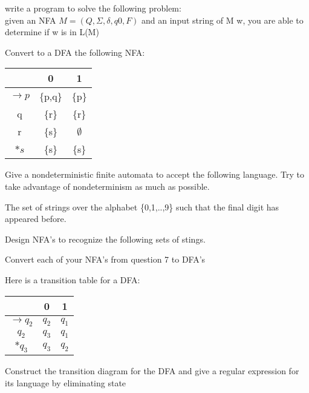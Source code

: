 \documentclass{exam}
\begin{document}
\begin{questions}
  \question
  write a program to solve the following problem:\\
  given an NFA $M = (Q, \Sigma, \delta, q0, F)$ and an input string of
  M w, you are able to determine if w is in L(M)

  \question
  Convert to a DFA the following NFA:
  \begin{center}
    \begin{tabular}{c|c|c}
      &0&1\\
      \hline
      $\rightarrow p$&\{p,q\}&\{p\}\\
      q&\{r\}&\{r\}\\
      r&\{s\}&$\emptyset$\\
      $*s$&\{s\}&\{s\}
    \end{tabular}
  \end{center}

  \question
  Give a nondeterministic finite automata to accept the following
  language. Try to take advantage of nondeterminism as much as possible.
  \begin{center}
    The set of strings over the alphabet \{0,1,..,9\} such that the final
    digit has appeared before.
  \end{center}

  \question
  Design NFA's to recognize the following sets of stings.

  \question
  Convert each of your NFA's from question 7 to DFA's

  \question
  Here is a transition table for a DFA:
  \begin{center}
    \begin{tabular}{c|c|c}
      &0&1\\
      \hline
      $\rightarrow q_2$&$q_2$&$q_1$\\
      $q_2$&$q_3$&$q_1$\\
      $*q_3$&$q_3$&$q_2$
    \end{tabular}
  \end{center}
  Construct the transition diagram for the DFA and give a regular
  expression for its language by eliminating state


\end{questions}
\end{document}
